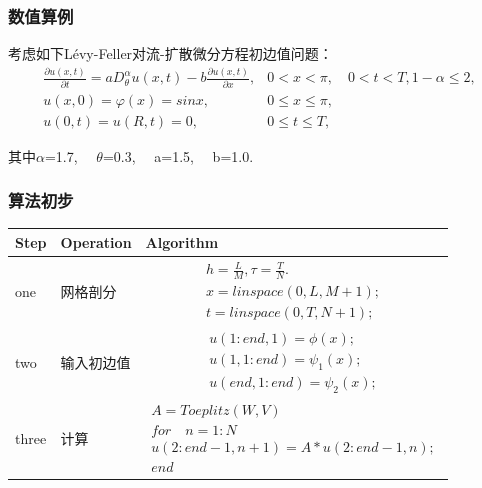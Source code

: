 \documentclass[notheorems,serif]{beamer}
\begin{document}
\begin{frame}
    \frametitle{数值算例}
考虑如下Lévy-Feller对流-扩散微分方程初边值问题：
\begin{equation} 
\begin{array}{ll}{\frac{\partial u(x, t)}{\partial t}=a D_{\theta}^{\alpha} u(x, t)-b \frac{\partial u(x, t)}{\partial x},} & {0<x<\pi,\quad 0<t<T}, 1-\alpha \leq 2, \\ {u(x, 0)=\varphi(x)=sin x,} & {0 \leq x \leq \pi,} \\ {u(0, t)=u(R, t)=0,} & {0 \leq t \leq T,}\end{array}
\end{equation}

其中$\alpha$=1.7,$\quad$ $\theta$=0.3,$\quad$ a=1.5,$\quad$ b=1.0.


\end{frame}

\begin{frame}
\frametitle{算法初步}
\begin{table}[h] %

	\begin{tabular}{p{2cm}|p{3.5cm}|p{8cm}} %
		\hline  
		\hline  
		Step & Operation & Algorithm \\ %
		\hline %
		one & 网格剖分 & \begin{equation*} 
		\begin{array}{ll}{h=\frac{L}{M},\tau=\frac{T}{N}.} \\ {x=linspace(0,L,M+1);} \\ {t=linspace(0,T,N+1);}\end{array}
		\end{equation*}\\  
		\hline  
		two & 输入初边值 & \begin{equation*} 
		\begin{array}{ll}{u(1:end,1)=\phi(x);} \\ {u(1,1:end)=\psi_{1}(x);} \\ {u(end,1:end)=\psi_{2}(x);}\end{array}
		\end{equation*}\\  
		\hline  
		three & 计算 & \begin{equation*} 
		\begin{array}{ll}{A=Toeplitz(W,V)}\\{for \quad n=1:N} \\ {u(2:end-1,n+1)=A*u(2:end-1,n);} \\ {end}\end{array}
		\end{equation*}\\  
		\hline   
		\hline  
	\end{tabular}  
\end{table}


\end{frame}
\end{document}
